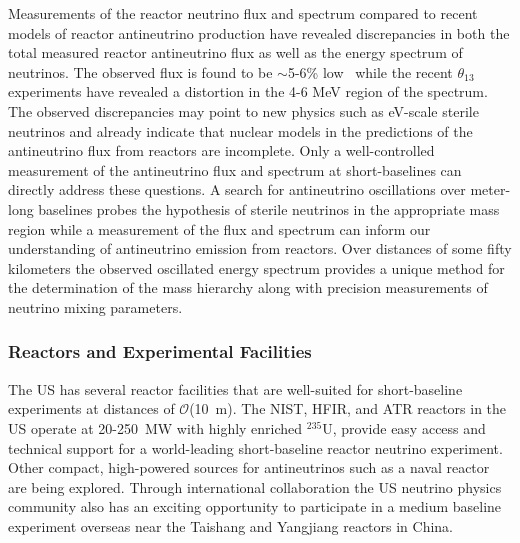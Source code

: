 Measurements of the reactor neutrino flux and spectrum compared to
recent models of reactor antineutrino production have revealed
discrepancies in both the total measured reactor antineutrino flux as
well as the energy spectrum of neutrinos. The observed flux is found
to be $\sim$5-6\% low~\cite{Mention:2011rk, Zhang:2013ela} while the
recent $\theta_{13}$ experiments have revealed a distortion in the 4-6
MeV region of the spectrum.  The observed discrepancies may point to
new physics such as eV-scale sterile neutrinos and already indicate
that nuclear models in the predictions of the antineutrino flux from
reactors are incomplete.  Only a well-controlled measurement of the
antineutrino flux and spectrum at short-baselines can directly address
these questions. A search for antineutrino oscillations over
meter-long baselines probes the hypothesis of sterile neutrinos in the
appropriate mass region while a measurement of the flux and spectrum
can inform our understanding of antineutrino emission from reactors.
Over distances of some fifty kilometers the observed oscillated energy
spectrum provides a unique method for the determination of the mass
hierarchy along with precision measurements of neutrino mixing
parameters.

\subsubsection{Reactors and Experimental Facilities}
The US has several reactor facilities that are well-suited for
short-baseline experiments at distances of $\mathcal{O}$(10~m). The
NIST, HFIR, and ATR reactors in the US operate at 20-250~MW with
highly enriched $^{235}$U, provide easy access and technical support
for a world-leading short-baseline reactor neutrino experiment. Other
compact, high-powered sources for antineutrinos such as a naval
reactor are being explored. Through international collaboration the US
neutrino physics community also has an exciting opportunity to
participate in a medium baseline experiment overseas near the Taishang
and Yangjiang reactors in China.


